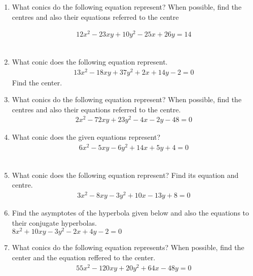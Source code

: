 \renewcommand{\theequation}{\theenumi}
\renewcommand{\thefigure}{\theenumi}
\begin{enumerate}[label=\thesubsection.\arabic*.,ref=\thesubsection.\theenumi]
%
\item What conics do the following equation represent? When possible, find the centres and also their equations referred to the centre

\begin{align}
12x^2-23xy+10y^2-25x+26y=14\label{eq:solutions/40/1/ques}
\end{align}
\\
\solution

\item What conic does the following equation represent. 
\begin{align}
13x^2-18xy+37y^2+2x+14y-2 = 0
\end{align}
Find the center.
\\
\solution

%
\item What conics do the following equation represent? When possible, find the centres and also their equations referred to the centre.
\begin{align}
2x^2-72xy+23y^2-4x-2y-48=0\label{eq:solutions/40/4/ques}
\end{align}
\solution
%
\item What conic does the given equations represent?
\begin{align}
6x^2-5xy-6y^2+14x+5y+4=0
\end{align}
\\
\solution

\item What conic does the following equation represent? Find its equation and centre.
\begin{align*}
	3x^2 - 8xy - 3y^2 + 10x - 13y + 8 =0 
\end{align*}
\solution

%
\item Find the asymptotes of the hyperbola given below and also the equations to their conjugate hyperbolas.\\
$8x^2+10xy-3y^2-2x+4y-2=0$
%
\solution

%
\item What conics do the following equation represents? When possible, find the center and the equation reffered to the center.
\begin{multline}
55x^2 - 120xy + 20y^2 +64x -48y=0
\label{eq:solutions/40/9/eqn1}
\end{multline}
%
\solution

\end{enumerate}


